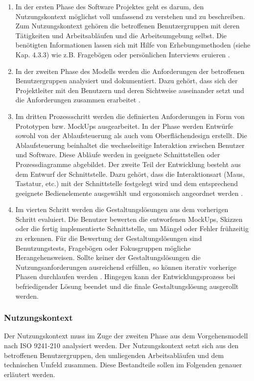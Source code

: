 \begin{enumerate}
    \item In der ersten Phase des Software Projektes geht es darum, den Nutzungskontext möglichst voll umfassend zu verstehen und zu beschreiben. Zum Nutzungskontext gehören die betroffenen Benutzergruppen mit deren Tätigkeiten und Arbeitsabläufen und die Arbeitsumgebung selbst. Die benötigten Informationen lassen sich mit Hilfe von Erhebungsmethoden (siehe Kap. 4.3.3) wie z.B. Fragebögen oder persönlichen Interviews eruieren \citep[vgl.][28\psq]{Ecker2015}.
    \item In der zweiten Phase des Modells werden die Anforderungen der betroffenen Benutzergruppen analysiert und dokumentiert. Dazu gehört, dass sich der Projektleiter mit den Benutzern und deren Sichtweise auseinander setzt und die Anforderungen zusammen erarbeitet \citep[vgl.][30\psq]{Ecker2015}.
    \item Im dritten Prozessschritt werden die definierten Anforderungen in Form von Prototypen bzw. MockUps ausgearbeitet. In der Phase werden Entwürfe sowohl von der Ablaufsteuerung als auch vom Oberflächendesign erstellt. Die Ablaufsteuerung beinhaltet die wechselseitige Interaktion zwischen Benutzer und Software. Diese Abläufe werden in geeignete Schnittstellen oder Prozessdiagramme abgebildet. Der zweite Teil der Entwicklung besteht aus dem Entwurf der Schnittstelle. Dazu gehört, dass die Interaktionsart (Maus, Tastatur, etc.) mit der Schnittstelle festgelegt wird und dem entsprechend geeignete Bedienelemente ausgewählt und ergonomisch angeordnet werden \citep[vgl.][33\psq]{Ecker2015}.
    \item Im vierten Schritt werden die Gestaltungslösungen aus dem vorherigen Schritt evaluiert. Die Benutzer bewerten die entworfenen MockUps, Skizzen oder die fertig implementierte Schnittstelle, um Mängel oder Fehler frühzeitig zu erkennen. Für die Bewertung der Gestaltungslösungen sind Benutzungstests, Fragebögen oder Fokusgruppen mögliche Herangehensweisen. Sollte keiner der Gestaltungslösungen die Nutzungsanforderungen ausreichend erfüllen, so können iterativ vorherige Phasen durchlaufen werden \citep[vgl.][34\psq]{Ecker2015}. Hingegen kann der Entwicklungsprozess bei befriedigender Lösung beendet und die finale Gestaltungslösung ausgerollt werden.
\end{enumerate}

\subsubsection{Nutzungskontext}
Der Nutzungskontext muss im Zuge der zweiten Phase aus dem Vorgehensmodell nach ISO 9241-210 analysiert werden. Der Nutzungskontext setzt sich aus den betroffenen Benutzergruppen, den umliegenden Arbeitsabläufen und dem technischen Umfeld zusammen. Diese Bestandteile sollen im Folgenden genauer erläutert werden.

